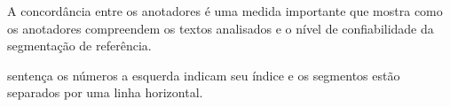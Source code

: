 







A concordância entre os anotadores é uma medida importante que mostra como os anotadores compreendem os textos analisados e o nível de confiabilidade da segmentação de referência.







sentença os números a esquerda indicam seu índice e os segmentos estão separados por uma linha horizontal.













































